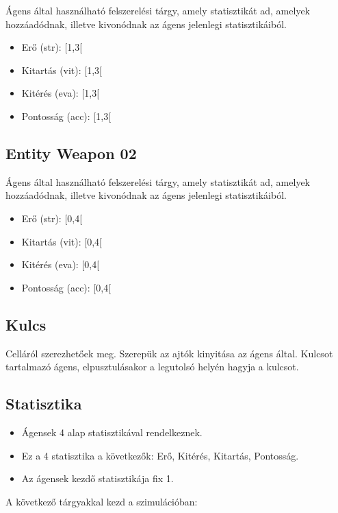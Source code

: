 Ágens által használható felszerelési tárgy, amely statisztikát ad, amelyek hozzáadódnak, illetve kivonódnak az ágens jelenlegi statisztikáiból.

\begin{itemize}
    \item Erő (str): [1,3[
    \item Kitartás (vit): [1,3[
    \item Kitérés (eva): [1,3[
    \item Pontosság (acc): [1,3[
\end{itemize}

\subsection{Entity Weapon 02}

Ágens által használható felszerelési tárgy, amely statisztikát ad, amelyek hozzáadódnak, illetve kivonódnak az ágens jelenlegi statisztikáiból.

\begin{itemize}
    \item Erő (str): [0,4[
    \item Kitartás (vit): [0,4[
    \item Kitérés (eva): [0,4[
    \item Pontosság (acc): [0,4[
\end{itemize}

\subsection{Kulcs}

Celláról szerezhetőek meg.
Szerepük az ajtók kinyitása az ágens által.
Kulcsot tartalmazó ágens, elpusztulásakor a legutolsó helyén hagyja a kulcsot.


\subsection{Statisztika}
\label{statisztika}
\begin{itemize}
    \item Ágensek 4 alap statisztikával rendelkeznek.
    \item Ez a 4 statisztika a következők: Erő, Kitérés, Kitartás, Pontosság.
    \item Az ágensek kezdő statisztikája fix 1.
\end{itemize}

\noindent A következő tárgyakkal kezd a szimulációban:

